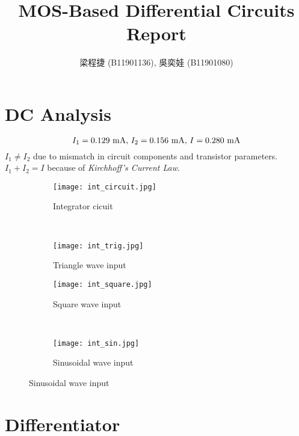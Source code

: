 \documentclass{article}
\title{MOS-Based Differential Circuits Report}
\author{梁程捷 (B11901136), 吳奕娃 (B11901080)}
\date{}
\begin{document}
\begin{CJK*}{UTF8}{bkai}
\maketitle
\section{DC Analysis}
\begin{equation*}
    I_1 = 0.129 \text{ \unit{\milli\ampere}}, \, I_2 = 0.156 \text{ \unit{\milli\ampere}}, \, I = 0.280 \text{ \unit{\milli\ampere}}
\end{equation*}
\textbf{$I_1 \ne I_2$} due to mismatch in circuit components and transistor parameters.\\
\textbf{$I_1 + I_2 = I$} because of \textit{Kirchhoff's Current Law}.\\

\begin{figure}[h]
\begin{center}

    \begin{subfigure}[b]{0.2\textwidth}
        \texttt{[image: int\_circuit.jpg]}
        \caption{Integrator cicuit}
    \end{subfigure}
    ~
    \begin{subfigure}[b]{0.3\textwidth}
        \texttt{[image: int\_trig.jpg]}
        \caption{Triangle wave input}
    \end{subfigure}

    \begin{subfigure}[b]{0.3\textwidth}
        \texttt{[image: int\_square.jpg]}
        \caption{Square wave input}
    \end{subfigure}
    ~
    \begin{subfigure}[b]{0.3\textwidth}
        \texttt{[image: int\_sin.jpg]}
        \caption{Sinusoidal wave input}
    \end{subfigure}
\end{center}   
\end{figure}


\section{Differentiator}


\begin{figure}[h]
    \begin{center}
    

\end{center}
\end{figure}
\end{CJK*}
\end{document}
